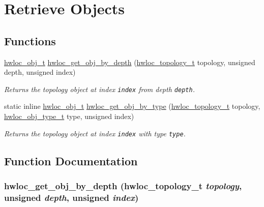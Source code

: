\hypertarget{group__hwlocality__traversal}{
\section{Retrieve Objects}
\label{group__hwlocality__traversal}
}
\subsection*{Functions}
\begin{CompactItemize}
\item 
\hyperlink{structhwloc__obj}{hwloc\_\-obj\_\-t} \hyperlink{group__hwlocality__traversal_g75e8ae1463be35a0fb82f2f7f73b8170}{hwloc\_\-get\_\-obj\_\-by\_\-depth} (\hyperlink{group__hwlocality__topology_g9d1e76ee15a7dee158b786c30b6a6e38}{hwloc\_\-topology\_\-t} topology, unsigned depth, unsigned index)
\begin{CompactList}\small\item\em Returns the topology object at index {\tt index} from depth {\tt depth}. \item\end{CompactList}\item 
static inline \hyperlink{structhwloc__obj}{hwloc\_\-obj\_\-t} \hyperlink{group__hwlocality__traversal_g0ed52dae74f311185210e7a19dbf44c5}{hwloc\_\-get\_\-obj\_\-by\_\-type} (\hyperlink{group__hwlocality__topology_g9d1e76ee15a7dee158b786c30b6a6e38}{hwloc\_\-topology\_\-t} topology, \hyperlink{group__hwlocality__types_gcd37bb612667dc437d66bfb175a8dc55}{hwloc\_\-obj\_\-type\_\-t} type, unsigned index)
\begin{CompactList}\small\item\em Returns the topology object at index {\tt index} with type {\tt type}. \item\end{CompactList}\end{CompactItemize}


\subsection{Function Documentation}
\hypertarget{group__hwlocality__traversal_g75e8ae1463be35a0fb82f2f7f73b8170}{
\subsubsection[{hwloc\_\-get\_\-obj\_\-by\_\-depth}]{ hwloc\_\-get\_\-obj\_\-by\_\-depth ({\bf hwloc\_\-topology\_\-t} {\em topology}, \/  unsigned {\em depth}, \/  unsigned {\em index})}}
\label{group__hwlocality__traversal_g75e8ae1463be35a0fb82f2f7f73b8170}


